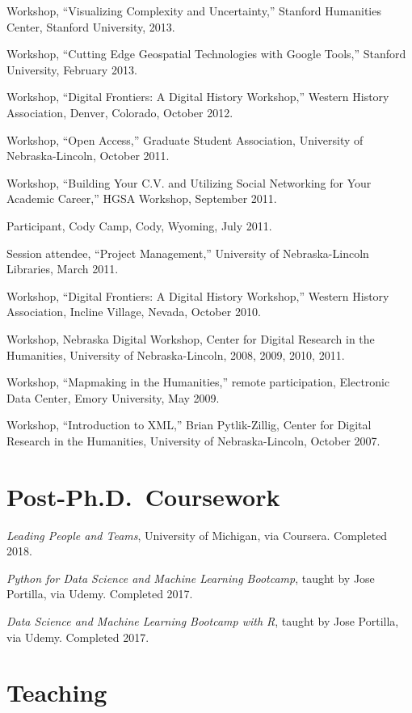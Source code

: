 Workshop, ``Visualizing Complexity and Uncertainty,'' Stanford
Humanities Center, Stanford University, 2013.

Workshop, ``Cutting Edge Geospatial Technologies with Google Tools,''
Stanford University, February 2013.

Workshop, ``Digital Frontiers: A Digital History Workshop,'' Western
History Association, Denver, Colorado, October 2012.

Workshop, ``Open Access,'' Graduate Student Association, University of
Nebraska-Lincoln, October 2011.

Workshop, ``Building Your C.V. and Utilizing Social Networking for Your
Academic Career,'' HGSA Workshop, September 2011.

Participant, Cody Camp, Cody, Wyoming, July 2011.

Session attendee, ``Project Management,'' University of Nebraska-Lincoln
Libraries, March 2011.

Workshop, ``Digital Frontiers: A Digital History Workshop,'' Western
History Association, Incline Village, Nevada, October 2010.

Workshop, Nebraska Digital Workshop, Center for Digital Research in the
Humanities, University of Nebraska-Lincoln, 2008, 2009, 2010, 2011.

Workshop, ``Mapmaking in the Humanities,'' remote participation,
Electronic Data Center, Emory University, May 2009.

Workshop, ``Introduction to XML,'' Brian Pytlik-Zillig, Center for
Digital Research in the Humanities, University of Nebraska-Lincoln,
October 2007.

\section{Post-Ph.D.~Coursework}\label{post-ph.d.coursework}

\emph{Leading People and Teams}, University of Michigan, via Coursera.
Completed 2018.

\emph{Python for Data Science and Machine Learning Bootcamp}, taught by
Jose Portilla, via Udemy. Completed 2017.

\emph{Data Science and Machine Learning Bootcamp with R}, taught by Jose
Portilla, via Udemy. Completed 2017.

\section{Teaching}\label{teaching}

